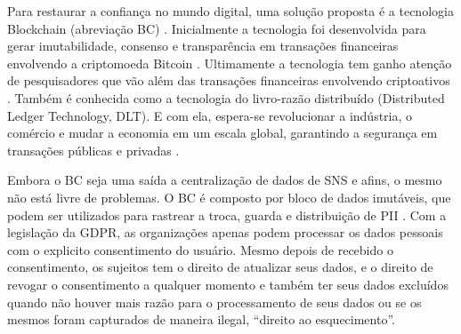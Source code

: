 
Para restaurar a confiança no mundo digital, uma solução proposta é a tecnologia Blockchain (abreviação BC) \citep{Schwerin2018}. Inicialmente a tecnologia foi desenvolvida para gerar imutabilidade, consenso e transparência em transações financeiras envolvendo a criptomoeda Bitcoin \citep{Nakamoto2009}. Ultimamente a tecnologia tem ganho atenção de pesquisadores que vão além das transações financeiras envolvendo criptoativos \citep{Al-ZabenNasr2018:article}. Também é conhecida como a tecnologia do livro-razão distribuído (Distributed Ledger Technology, DLT). E com ela, espera-se revolucionar a indústria, o comércio e mudar a economia em um escala global, garantindo a segurança em transações públicas e privadas \citep{Underwood2016:article}. %

Embora o BC seja uma saída a centralização de dados de SNS e afins, o mesmo não está livre de problemas. O BC é composto por bloco de dados imutáveis, que podem ser utilizados para rastrear a troca, guarda e distribuição de PII \citep{Al-ZabenNasr2018:article}. Com a legislação da GDPR, as organizações apenas podem processar os dados pessoais com o explicito consentimento do usuário. Mesmo depois de recebido o consentimento, os sujeitos tem o direito de atualizar seus dados, e o direito de revogar o consentimento a qualquer momento e também ter seus dados excluídos quando não houver mais razão para o processamento de seus dados ou se os mesmos foram capturados de maneira ilegal, ``direito ao esquecimento''. \citep{EuropeanCommission2016:misc} %





